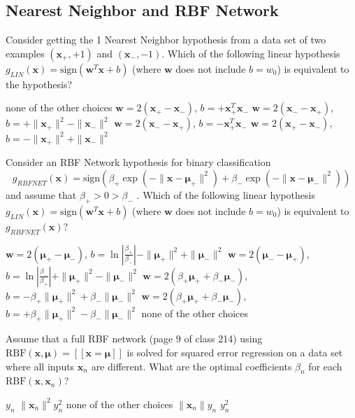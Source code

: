 \documentclass[a4paper,10pt]{exam}
\begin{document}
\begin{questions}
	\section*{Nearest Neighbor and RBF Network}
	\question
	Consider getting the 1 Nearest Neighbor hypothesis from a data set of two examples $(\mathbf{x}_+, +1)$ and $(\mathbf{x}_-, -1)$. Which of the following linear hypothesis $g_{LIN}(\mathbf{x}) = \mbox{sign}(\mathbf{w}^T \mathbf{x} + b)$ (where $\mathbf{w}$ does not include $b = w_0$) is equivalent to the hypothesis?
	\begin{checkboxes}
		\choice none of the other choices
		\choice $\mathbf{w} = 2 (\mathbf{x}_+ - \mathbf{x}_-)$, $b = + \mathbf{x}_+^T \mathbf{x}_-$
		\choice $\mathbf{w} = 2 (\mathbf{x}_- - \mathbf{x}_+)$, $b = + \|\mathbf{x}_+\|^2 - \|\mathbf{x}_-\|^2$
		\choice $\mathbf{w} = 2 (\mathbf{x}_- - \mathbf{x}_+)$, $b = -\mathbf{x}_+^T \mathbf{x}_-$
		\CorrectChoice $\mathbf{w} = 2 (\mathbf{x}_+ - \mathbf{x}_-)$, $b = - \|\mathbf{x}_+\|^2 + \|\mathbf{x}_-\|^2$\\
	\end{checkboxes}

	\question Consider an RBF Network hypothesis for binary classification
	\[g_{RBFNET}(\mathbf{x}) = \mbox{sign}\left(\beta_+ \exp(-\|\mathbf{x} - {\boldsymbol\mu}_+\|^2) + \beta_- \exp(-\|\mathbf{x} - {\boldsymbol\mu}_-\|^2)\right)\]
	and assume that $\beta_+ > 0 > \beta_-$ . Which of the following linear hypothesis $g_{LIN}(\mathbf{x}) = \mbox{sign}(\mathbf{w}^T \mathbf{x} + b)$ (where $\mathbf{w}$ does not include $b = w_0$) is equivalent to $g_{RBFNET}(\mathbf{x})$?
	\begin{checkboxes}
		\CorrectChoice $\mathbf{w} = 2 ({\boldsymbol\mu}_+ - {\boldsymbol\mu}_-)$, $b = \ln \left|\frac{\beta_+}{\beta_-}\right| - \|{\boldsymbol\mu}_+\|^2 + \|{\boldsymbol\mu}_-\|^2$
		\choice $\mathbf{w} = 2 ({\boldsymbol\mu}_- - {\boldsymbol\mu}_+)$, $b = \ln \left|\frac{\beta_-}{\beta_+}\right| + \|{\boldsymbol\mu}_+\|^2 - \|{\boldsymbol\mu}_-\|^2$
		\choice $\mathbf{w} = 2 (\beta_+ {\boldsymbol\mu}_+ + \beta_- {\boldsymbol\mu}_-)$, $b = - \beta_+\|{\boldsymbol\mu}_+\|^2 + \beta_- \|{\boldsymbol\mu}_-\|^2$
		\choice $\mathbf{w} = 2 (\beta_+ {\boldsymbol\mu}_+ + \beta_- {\boldsymbol\mu}_-)$, $b = + \beta_+\|{\boldsymbol\mu}_+\|^2 - \beta_- \|{\boldsymbol\mu}_-\|^2$
		\choice none of the other choices\\
	\end{checkboxes}

	\question Assume that a full RBF network (page 9 of class 214) using $\mbox{RBF}(\mathbf{x}, {\boldsymbol\mu}) = [[\mathbf{x} = {    \boldsymbol\mu}]]$ is solved for squared error regression on a data set where all inputs $\mathbf{x}_n$ are different. What are the optimal coefficients $\beta_n$ for each $\mbox{RBF}(\mathbf{x}, \mathbf{x}_n)$?
	\begin{checkboxes}
		\CorrectChoice $y_n$
		\choice $\|\mathbf{x}_n\|^2 y_n^2$
		\choice none of the other choices
		\choice $\|\mathbf{x}_n\| y_n$
		\choice $y_n^2$\\
	\end{checkboxes}



\end{questions}
\end{document}
